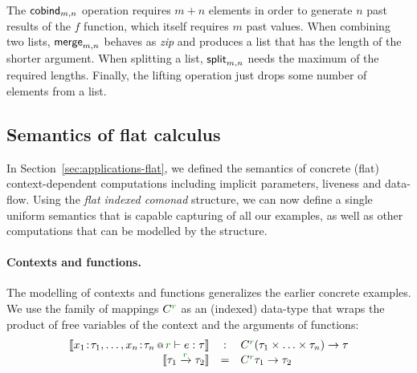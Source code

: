 The $\textnormal{\sffamily cobind}_{m,n}$ operation requires $m + n$ elements in order to generate $n$ past results 
of the $f$ function, which itself requires $m$ past values. When combining two lists, 
$\textnormal{\sffamily merge}_{m,n}$ behaves as \emph{zip} and produces a list that has the length of the shorter 
argument. When splitting a list, $\textnormal{\sffamily split}_{m, n}$ needs the maximum of the required lengths. 
Finally, the lifting operation just drops some number of elements from a list.


\subsection{Semantics of flat calculus}

In Section~\ref{sec:applications-flat}, we defined the semantics of concrete (flat) context-dependent
computations including implicit parameters, liveness and data-flow. Using the \emph{flat indexed 
comonad} structure, we can now define a single uniform semantics that is capable capturing of all 
our examples, as well as other computations that can be modelled by the structure.

\paragraph{Contexts and functions.}
The modelling of contexts and functions generalizes the earlier concrete examples. We use the 
family of mappings $\ctyp{\cclrd{r}}{}$ as an (indexed) data-type that wraps the product of 
free variables of the context and the arguments of functions:
%
\begin{equation*}
\begin{array}{rcl}
\sem{\coctx{x_1\!:\!\tau_1, \ldots, x_n\!:\!\tau_n}{ \cclrd{r} } \vdash e : \tau} 
  &:& \ctyp{\cclrd{r}}{(\tau_1 \times \ldots \times \tau_n)} \rightarrow \tau\\
\sem{\tau_1 \xrightarrow{\cclrd{r}} \tau_2} &=& \ctyp{\cclrd{r}}{\tau_1} \rightarrow \tau_2
\end{array}
\end{equation*}


